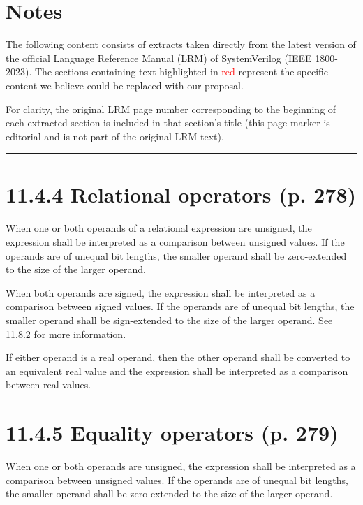 \documentclass{article}
\begin{document}
\section*{Notes}

The following content consists of extracts taken directly from the latest
version of the official Language Reference Manual (LRM) of SystemVerilog
(IEEE 1800-2023). The sections containing text highlighted in
\textcolor{red}{red} represent the specific content we believe could be replaced
with our proposal.

For clarity, the original LRM page number corresponding to the beginning of each
extracted section is included in that section's title (this page marker is
editorial and is not part of the original LRM text).

\begin{center}
\noindent\rule{.8\textwidth}{1pt}  
\end{center}

\section*{11.4.4 Relational operators (p. 278)}

\textelp{}

When one or both operands of a relational expression are unsigned, the
expression shall be interpreted as a comparison between unsigned values.
  {
    \color{red}
    If the operands are of unequal bit lengths, the smaller operand
    shall be zero-extended to the size of the larger operand.
  }

When both operands are signed, the expression shall be interpreted as a
comparison between signed values.
  {
    \color{red}
    If the operands are of unequal bit
    lengths, the smaller operand shall be sign-extended to the size of the larger
    operand. See 11.8.2 for more information.
  }

If either operand is a real operand, then the other operand shall be converted to
an equivalent real value and the expression shall be interpreted as a comparison
between real values.

\textelp{}

\section*{11.4.5 Equality operators (p. 279)}

\textelp{}

When one or both operands are unsigned, the expression shall be interpreted as a
comparison between unsigned values.
  {
    \color{red}
    If the operands are of unequal bit
    lengths, the smaller operand shall be zero-extended to the size of the larger
    operand.
  }
\end{document}
